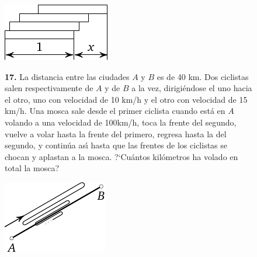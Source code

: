 \documentclass[12pt]{article}  %
\begin{document}
\begin{figure}[h!]
\centering
\footnotesize
\includegraphics[scale=1]{taskbook-97}
\end{figure}
\begin{figure}[h]
\begin{minipage}[c][][c]{0.7 \textwidth}

\newpage
{\bf 17.} La distancia entre las ciudades $A$ y $B$ es de 40 km. Dos ciclistas salen respectivamente de $A$ y de $B$ 
a la vez, dirigi\'endose el uno hacia el otro, uno con velocidad de 10 km/h y el otro con velocidad de 15 km/h. 
Una mosca sale desde el primer ciclista cuando est\'a en $A$ volando a una velocidad de 100km/h, toca la frente del 
segundo, vuelve a volar hasta la frente del primero, regresa hasta la del segundo, y contin\'ua as\'{\i} hasta que las 
frentes de los ciclistas se chocan y aplastan a la mosca.
?`Cu\'antos kil\'ometros ha volado en total la mosca?
\end{minipage}
\hfill
\begin{minipage}[c]{0.2 \textwidth}
\includegraphics[scale=1]{taskbook-1}
\end{minipage}
\end{figure}

\end{document}
